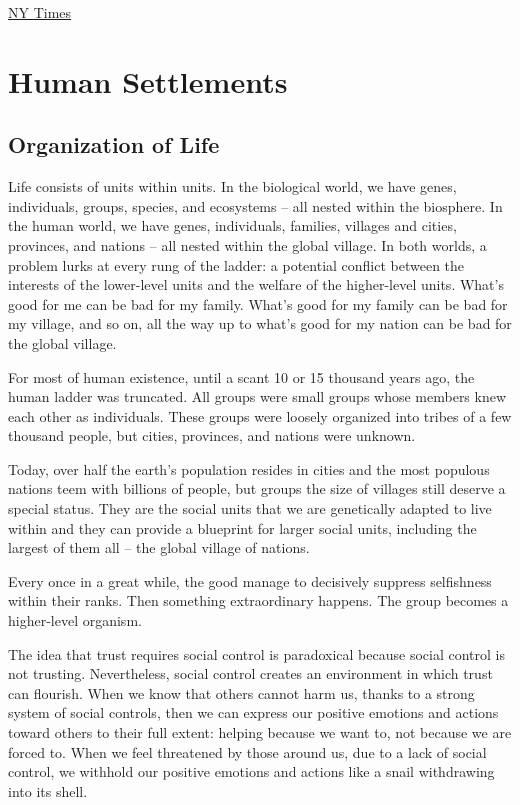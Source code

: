 \documentclass[
]{book}
\begin{document}
\href{https://www.nytimes.com/2021/02/03/realestate/luxury-high-rise-432-park.html}{NY Times}

\hypertarget{human-settlements}{%
\chapter{Human Settlements}\label{human-settlements}}

\hypertarget{organization-of-life}{%
\section{Organization of Life}\label{organization-of-life}}

Life consists of units within units. In the biological world, we have genes, individuals, groups, species, and ecosystems -- all nested within the biosphere. In the human world, we have genes, individuals, families, villages and cities, provinces, and nations -- all nested within the global village. In both worlds, a problem lurks at every rung of the ladder: a potential conflict between the interests of the lower-level units and the welfare of the higher-level units. What's good for me can be bad for my family. What's good for my family can be bad for my village, and so on, all the way up to what's good for my nation can be bad for the global village.

For most of human existence, until a scant 10 or 15 thousand years ago, the human ladder was truncated. All groups were small groups whose members knew each other as individuals. These groups were loosely organized into tribes of a few thousand people, but cities, provinces, and nations were unknown.

Today, over half the earth's population resides in cities and the most populous nations teem with billions of people, but groups the size of villages still deserve a special status. They are the social units that we are genetically adapted to live within and they can provide a blueprint for larger social units, including the largest of them all -- the global village of nations.

Every once in a great while, the good manage to decisively suppress selfishness within their ranks. Then something extraordinary happens. The group becomes a higher-level organism.

The idea that trust requires social control is paradoxical because social control is not trusting. Nevertheless, social control creates an environment in which trust can flourish. When we know that others cannot harm us, thanks to a strong system of social controls, then we can express our positive emotions and actions toward others to their full extent: helping because we want to, not because we are forced to. When we feel threatened by those around us, due to a lack of social control, we withhold our positive emotions and actions like a snail withdrawing into its shell.
\end{document}

